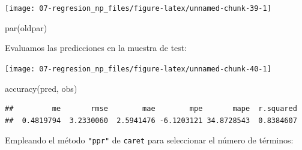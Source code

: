 \documentclass[
  spanish,
]{book}
\newenvironment{Shaded}{\begin{snugshade}}{\end{snugshade}}
\newcommand{\AttributeTok}[1]{\textcolor[rgb]{0.77,0.63,0.00}{#1}}
\newcommand{\DecValTok}[1]{\textcolor[rgb]{0.00,0.00,0.81}{#1}}
\newcommand{\FunctionTok}[1]{\textcolor[rgb]{0.00,0.00,0.00}{#1}}
\newcommand{\NormalTok}[1]{#1}
\newcommand{\OtherTok}[1]{\textcolor[rgb]{0.56,0.35,0.01}{#1}}
\newcommand{\SpecialCharTok}[1]{\textcolor[rgb]{0.00,0.00,0.00}{#1}}
\newcommand{\StringTok}[1]{\textcolor[rgb]{0.31,0.60,0.02}{#1}}
\theoremstyle{break}
\theoremstyle{definition}
\theoremstyle{definition}
\theoremstyle{definition}
\theoremstyle{definition}
\theoremstyle{remark}
\begin{document}
\begin{center}\texttt{[image: 07-regresion\_np\_files/figure-latex/unnamed-chunk-39-1]} \end{center}

\begin{Shaded}
\begin{Highlighting}[]
\FunctionTok{par}\NormalTok{(oldpar)}
\end{Highlighting}
\end{Shaded}

Evaluamos las predicciones en la muestra de test:

\begin{Shaded}
\end{Shaded}

\begin{center}\texttt{[image: 07-regresion\_np\_files/figure-latex/unnamed-chunk-40-1]} \end{center}

\begin{Shaded}
\begin{Highlighting}[]
\FunctionTok{accuracy}\NormalTok{(pred, obs)}
\end{Highlighting}
\end{Shaded}

\begin{verbatim}
##         me       rmse        mae        mpe       mape  r.squared 
##  0.4819794  3.2330060  2.5941476 -6.1203121 34.8728543  0.8384607
\end{verbatim}

Empleando el método \texttt{"ppr"} de \texttt{caret} para seleccionar el número de términos:
\end{document}
